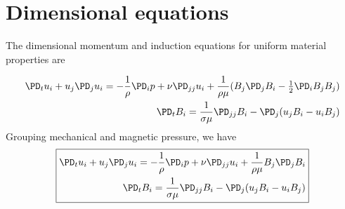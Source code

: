 \documentclass[11pt]{article}
\begin{document}
\doublespacing
\MOONSTITLE
\maketitle

\section{Dimensional equations}
The dimensional momentum and induction equations for uniform material properties are

\begin{equation}\begin{aligned}
\PD_t u_i+u_j\PD_j u_i = -\frac{1}{\rho} \PD_i p+ \nu \PD_{jj} u_i + \frac{1}{\rho \mu} (B_j \PD_j B_i - \tfrac{1}{2} \PD_i B_j B_j) \\
\PD_t B_i = \frac{1}{\sigma \mu} \PD_{jj} B_i - \PD_j (u_j B_i - u_i B_j)
\end{aligned}\end{equation}
Grouping mechanical and magnetic pressure, we have
\begin{equation}\boxed{\begin{aligned}
\PD_t u_i+u_j\PD_j u_i = -\frac{1}{\rho} \PD_i p+ \nu \PD_{jj} u_i + \frac{1}{\rho \mu} B_j \PD_j B_i \\
\PD_t B_i = \frac{1}{\sigma \mu} \PD_{jj} B_i - \PD_j (u_j B_i - u_i B_j)
\end{aligned}}\end{equation}
\end{document}
